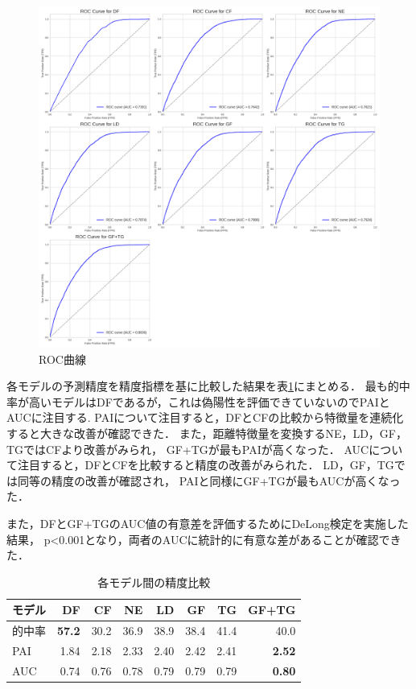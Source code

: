 \begin{figure}
  \centering %
  \includegraphics[scale=0.25]{./non-crime-timeseries-fig/roc_auc.png}
  \caption{ROC曲線}
  \label{fig:non-crime-timeseries-roc}
\end{figure}
各モデルの予測精度を精度指標を基に比較した結果を表\ref{tb:fig:non-crime-timeseries-index}にまとめる．
最も的中率が高いモデルはDFであるが，これは偽陽性を評価できていないのでPAIとAUCに注目する.
PAIについて注目すると，DFとCFの比較から特徴量を連続化すると大きな改善が確認できた．
また，距離特徴量を変換するNE，LD，GF，TGではCFより改善がみられ，
GF+TGが最もPAIが高くなった．
AUCについて注目すると，DFとCFを比較すると精度の改善がみられた．
LD，GF，TGでは同等の精度の改善が確認され，
PAIと同様にGF+TGが最もAUCが高くなった．

また，DFとGF+TGのAUC値の有意差を評価するためにDeLong検定\citep{DeLong}を実施した結果，
p<0.001となり，両者のAUCに統計的に有意な差があることが確認できた．

\begin{table}[htbp]
  \centering
  \caption{各モデル間の精度比較}
  \begin{tabular}{l|r||r|r|r|r|r|r}
  \hline

  モデル & DF & CF & NE & LD & GF & TG & GF+TG \\  \hline\hline
  的中率 & \bf{57.2} & 30.2 & 36.9 & 38.9 & 38.4 & 41.4 & 40.0 \\ 
  PAI & 1.84 & 2.18 & 2.33 & 2.40 & 2.42 & 2.41 & \bf{2.52} \\ 
  AUC & 0.74 & 0.76 & 0.78 & 0.79 & 0.79 & 0.79 & \bf{0.80} \\ \hline
  


  \end{tabular}
  \label{tb:fig:non-crime-timeseries-index}
\end{table}

\FloatBarrier